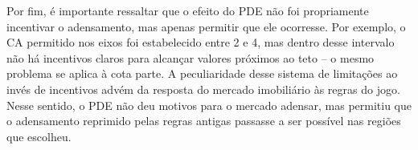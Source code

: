 
Por fim, é importante ressaltar que o efeito do PDE não foi propriamente incentivar o adensamento, mas apenas permitir que ele ocorresse. Por exemplo, o CA permitido nos eixos foi estabelecido entre 2 e 4, mas dentro desse intervalo não há incentivos claros para alcançar valores próximos ao teto -- o mesmo problema se aplica à cota parte. A peculiaridade desse sistema de limitações ao invés de incentivos advém da resposta do mercado imobiliário às regras do jogo. Nesse sentido, o PDE não deu motivos para o mercado adensar, mas permitiu que o adensamento reprimido pelas regras antigas passasse a ser possível nas regiões que escolheu.




